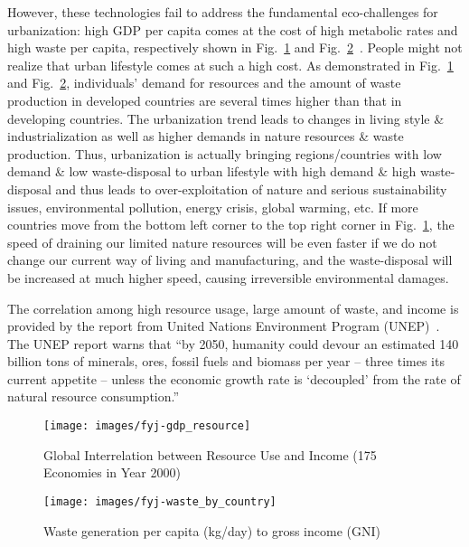 \documentclass[letterpaper, twocolumn, 10pt, conference]{IEEEtran}
\begin{document}
However, these technologies fail to address the fundamental eco-challenges for urbanization: high GDP per capita comes at the cost of high metabolic rates and high waste per capita, respectively shown in Fig.~\ref{fig:fyj:gdp_resource} and Fig.~\ref{fig:fyj:waste_country}~\cite{UN-world-energy-report}. 
People might not realize that urban lifestyle comes at such a high cost. As demonstrated in Fig.~\ref{fig:fyj:gdp_resource} and Fig.~\ref{fig:fyj:waste_country}, individuals' demand for resources and the amount of waste production in developed countries are several times higher than that in developing countries. 
The urbanization trend leads to changes in living style \& industrialization as well as higher demands in nature resources \& waste production. Thus, urbanization is actually bringing regions/countries with low demand \& low waste-disposal to urban lifestyle with high demand \& high waste-disposal and thus leads to over-exploitation of nature and serious sustainability issues, environmental pollution, energy crisis, global warming, etc.
If more countries move from the bottom left corner to the top right corner in Fig.~\ref{fig:fyj:gdp_resource}, the speed of draining our limited nature resources will be even faster if we do not change our current way of living and manufacturing, and the waste-disposal will be increased at much higher speed, causing irreversible environmental damages.  

The correlation among high resource usage, large amount of waste, and income is provided by the report from United Nations Environment Program (UNEP)~\cite{united2011decoupling}.  The UNEP report warns that \enquote{by 2050, humanity could devour an estimated 140 billion tons of minerals, ores, fossil fuels and biomass per year – three times its current appetite – unless the economic growth rate is \enquote{decoupled} from the rate of natural resource consumption.} 


\begin{figure}[h!]
        \centering
        \texttt{[image: images/fyj-gdp\_resource]}
        \caption{Global Interrelation between Resource Use and Income (175 Economies in Year 2000)}
        \label{fig:fyj:gdp_resource}
\end{figure}





\begin{figure}[h!]
        \centering
        \texttt{[image: images/fyj-waste\_by\_country]}
        \caption{Waste generation per capita (kg/day) to gross income (GNI)}
        \label{fig:fyj:waste_country}
\end{figure}
\end{document}
